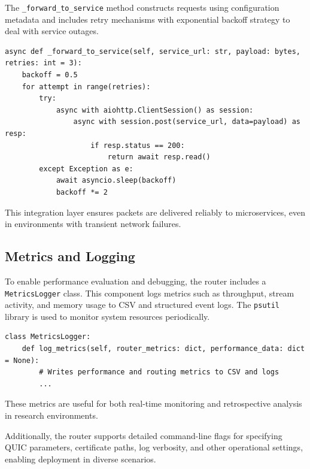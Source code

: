 The \texttt{\_forward\_to\_service} method constructs requests using configuration metadata and includes retry mechanisms with exponential backoff strategy to deal with service outages.

\begin{lstlisting}[breaklines=true,basicstyle=\small\ttfamily,frame=single]
async def _forward_to_service(self, service_url: str, payload: bytes, retries: int = 3):
    backoff = 0.5
    for attempt in range(retries):
        try:
            async with aiohttp.ClientSession() as session:
                async with session.post(service_url, data=payload) as resp:
                    if resp.status == 200:
                        return await resp.read()
        except Exception as e:
            await asyncio.sleep(backoff)
            backoff *= 2
\end{lstlisting}

This integration layer ensures packets are delivered reliably to microservices, even in environments with transient network failures.

\subsection{Metrics and Logging}

To enable performance evaluation and debugging, the router includes a \texttt{MetricsLogger} class. This component logs metrics such as throughput, stream activity, and memory usage to CSV and structured event logs. The \texttt{psutil} library is used to monitor system resources periodically.

\begin{lstlisting}[breaklines=true,basicstyle=\small\ttfamily,frame=single]
class MetricsLogger:
    def log_metrics(self, router_metrics: dict, performance_data: dict = None):
        # Writes performance and routing metrics to CSV and logs
        ...
\end{lstlisting}

These metrics are useful for both real-time monitoring and retrospective analysis in research environments.

Additionally, the router supports detailed command-line flags for specifying QUIC parameters, certificate paths, log verbosity, and other operational settings, enabling deployment in diverse scenarios.


